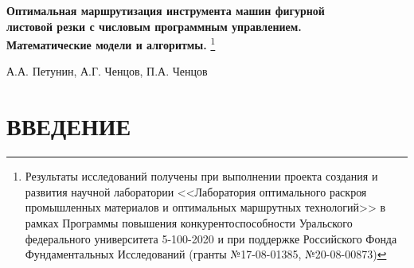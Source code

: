 \documentclass[12pt]{report}
\begin{document}

\setcounter{page}{1}







\setcounter{page}{1}
 \begin{center}
{\bf Оптимальная маршрутизация инструмента машин фигурной\\ листовой резки с числовым
программным управлением.\\ Математические модели и алгоритмы.}
\footnote{
Результаты исследований получены
при выполнении проекта создания и
развития научной лаборатории
<<Лаборатория оптимального раскроя промышленных материалов
и оптимальных маршрутных технологий>>
в рамках Программы повышения конкурентоспособности
Уральского федерального университета 5-100-2020
и при поддержке Российского Фонда Фундаментальных Исследований
(гранты №17-08-01385, №20-08-00873)
}

\vspace{0.5cm}
А.А. Петунин, А.Г. Ченцов, П.А. Ченцов
\end{center}
\newpage












\tableofcontents
\newpage





\section*{ВВЕДЕНИЕ}
\end{document}
